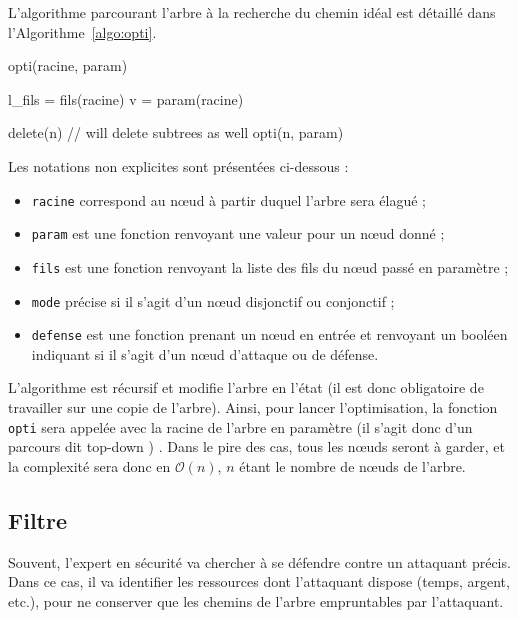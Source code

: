 		L'algorithme parcourant l'arbre à la recherche du chemin idéal est détaillé dans l'Algorithme~\ref{algo:opti}.
		\begin{algorithm}[h!]
			\caption{opti(racine, param)}
			\label{algo:opti}
			\begin{algorithmic}
				\STATE l\_fils = fils(racine)
					\RETURN
				\ENDIF
				\STATE
					\STATE v = param(racine)

							\STATE delete(n) // will delete subtrees as well
						\ENDIF
					\ENDFOR
				\ENDIF
				\STATE
					\STATE opti(n, param)
				\ENDFOR
			\end{algorithmic}
		\end{algorithm}
		Les notations non explicites sont présentées ci-dessous :
		\begin{itemize}
			\item \verb|racine| correspond au nœud à partir duquel l'arbre sera élagué ;
			\item \verb|param| est une fonction renvoyant une valeur pour un nœud donné ;
			\item \verb|fils| est une fonction renvoyant la liste des fils du nœud passé en paramètre ;
			\item \verb|mode| précise si il s'agit d'un nœud disjonctif ou conjonctif ;
			\item \verb|defense| est une fonction prenant un nœud en entrée et renvoyant un booléen indiquant si il s'agit d'un nœud d'attaque ou de défense.
		\end{itemize}
		L'algorithme est récursif et modifie l'arbre en l'état (il est donc obligatoire de travailler sur une copie de l'arbre). 
		Ainsi, pour lancer l'optimisation, la fonction \verb|opti| sera appelée avec la racine de l'arbre en paramètre (il s'agit donc d'un parcours dit \og top-down \fg) . Dans le pire des cas, tous les nœuds seront à garder, et la complexité sera donc en $\mathcal{O}(n)$, $n$ étant le nombre de nœuds de l'arbre.

	\subsection{Filtre}
		\label{subsection:filtre} 

		Souvent, l'expert en sécurité va chercher à se défendre contre un attaquant précis. Dans ce cas, il va identifier les ressources dont l'attaquant dispose (temps, argent, etc.), pour ne conserver que les chemins de l'arbre empruntables par l'attaquant.

